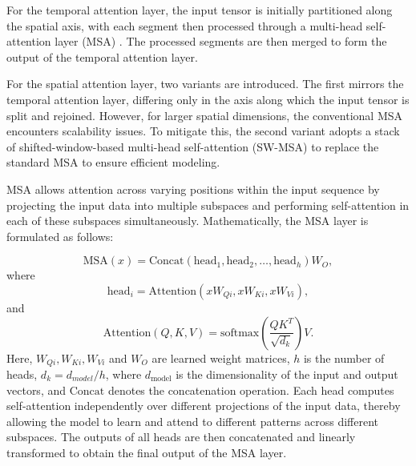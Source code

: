 \documentclass[11pt]{article}
\begin{document}


For the temporal attention layer, the input tensor is initially partitioned along the spatial axis, with each segment then processed through a multi-head self-attention layer (MSA) \citep{vaswani2017attention}. The processed segments are then merged to form the output of the temporal attention layer.


For the spatial attention layer, two variants are introduced. The first mirrors the temporal attention layer, differing only in the axis along which the input tensor is split and rejoined. However, for larger spatial dimensions, the conventional MSA encounters scalability issues. To mitigate this, the second variant adopts a stack of shifted-window-based multi-head self-attention (SW-MSA) \citep{liu2021swin} to replace the standard MSA to ensure efficient modeling.

MSA allows attention across varying positions within the input sequence by projecting the input data into multiple subspaces and performing self-attention in each of these subspaces simultaneously. Mathematically, the MSA layer is formulated as follows:



\begin{equation}
    \text{MSA}(x) = \text{Concat}(\text{head}_1, \text{head}_2, \ldots, \text{head}_h)W_O,
\end{equation}
where 
\begin{equation}
	\text{head}_i = \text{Attention}(xW_{Qi}, xW_{Ki}, xW_{Vi}),
\end{equation}
and
\begin{equation}
    \text{Attention}(Q, K, V) = \text{softmax}\left(\frac{QK^T}{\sqrt{d_k}}\right) V.
\end{equation}
Here, $W_{Qi}, W_{Ki}, W_{Vi}$ and $W_O$ are learned weight matrices, $h$ is the number of heads, $d_k=d_{model}/h$, where $d_{\text{model}}$ is the dimensionality of the input and output vectors, and $\text{Concat}$ denotes the concatenation operation. Each head computes self-attention independently over different projections of the input data, thereby allowing the model to learn and attend to different patterns across different subspaces. The outputs of all heads are then concatenated and linearly transformed to obtain the final output of the MSA layer. 
\end{document}
